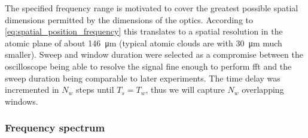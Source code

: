 The specified frequency range is motivated to cover the greatest possible
spatial dimensions permitted by the dimensions of the optics. According to
\cref{eq:spatial_position_frequency} this translates to a spatial resolution
in the atomic plane of about \SI{146}{\micro\meter} (typical atomic clouds are
with \SI{30}{\micro\meter} much smaller). Sweep and window duration were
selected as a compromise between the oscilloscope being able to resolve the
signal fine enough to perform \gls{fft} and the sweep duration being
comparable to later experiments. The time delay was incremented in $N_w$ steps
until $T_s=T_w$, thus we will capture $N_w$ overlapping windows.

\subsubsection{Frequency spectrum}

